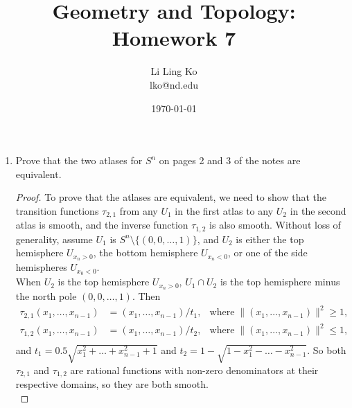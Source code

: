 \documentclass{article}
\begin{document}
\title{Geometry and Topology: Homework 7}
\author{Li Ling Ko\\ lko@nd.edu}
\date{\today}
\maketitle

\begin{enumerate}[label={\bf Q\arabic*:}]
  \item Prove that the two atlases for $S^n$ on pages 2 and 3 of the notes
    are equivalent.

    \begin{proof}
      To prove that the atlases are equivalent, we need to show that the
      transition functions $\tau_{2,1}$ from any $U_1$ in the first atlas
      to any $U_2$ in the second atlas is smooth, and the inverse function
      $\tau_{1,2}$ is also smooth. Without loss of generality, assume $U_1$
      is $S^n\setminus\{(0,0,\ldots,1)\}$, and $U_2$ is either the top
      hemisphere $U_{x_n>0}$, the bottom hemisphere $U_{x_n<0}$, or one of
      the side hemispheres $U_{x_0<0}$. \\

      When $U_2$ is the top hemisphere $U_{x_n>0}$, $U_1\cap U_2$ is the
      top hemisphere minus the north pole $(0,0,\ldots,1)$. Then
      \begin{align*}
        \tau_{2,1}(x_1,\ldots,x_{n-1}) &= (x_1,\ldots,x_{n-1})/t_1, &
        \text{where}\; \|(x_1,\ldots,x_{n-1})\|^2\geq1, \\
        \tau_{1,2}(x_1,\ldots,x_{n-1}) &= (x_1,\ldots,x_{n-1})/t_2, &
        \text{where}\; \|(x_1,\ldots,x_{n-1})\|^2\leq1, \\
      \end{align*}
      and $t_1=0.5\sqrt{x_1^2+\ldots+x_{n-1}^2+1}$ and
      $t_2=1-\sqrt{1-x_1^2-\ldots-x_{n-1}^2}$. So both $\tau_{2,1}$ and
      $\tau_{1,2}$ are rational functions with non-zero denominators at
      their respective domains, so they are both smooth. \\
    \end{proof}
\end{enumerate}
\end{document}
